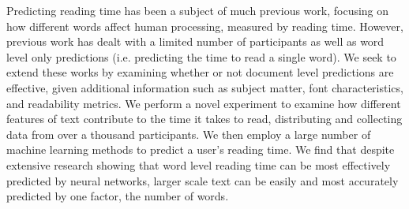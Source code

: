 Predicting reading time has been a subject of much previous work, focusing on how different words affect human processing, measured by reading time.  However, previous work has dealt with a limited number of participants as well as word level only predictions (i.e. predicting the time to read a single word). We seek to extend these works by examining whether or not document level predictions are effective, given additional information such as subject matter, font characteristics, and readability metrics.  We perform a novel experiment to examine how different features of text contribute to the time it takes to read, distributing and collecting data from over a thousand participants.  We then employ a large number of machine learning methods to predict a user's reading time.  We find that despite extensive research showing that word level reading time can be most effectively predicted by neural networks, larger scale text can be easily and most accurately predicted by one factor, the number of words.

